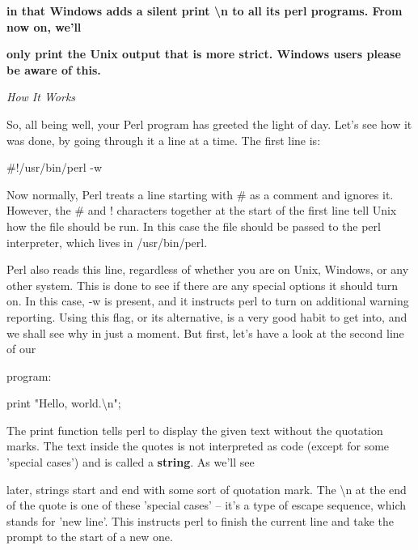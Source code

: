 \documentclass[a4paper,11pt]{book}
\begin{document}
\noindent \textbf{in that Windows adds a silent print \textbackslash n to all its perl programs. From now on, we'll}

\noindent \textbf{only print the Unix output that is more strict. Windows users please be aware of this.}

\noindent 

\noindent 

\noindent \textit{How It Works}

\noindent So, all being well, your Perl program has greeted the light of day. Let's see how it was done, by going through it a line at a time. The first line is:

\noindent 

\noindent 

\noindent \#!/usr/bin/perl -w

\noindent 

\noindent Now normally, Perl treats a line starting with \# as a comment and ignores it. However, the \# and ! characters together at the start of the first line tell Unix how the file should be run. In this case the file should be passed to the perl interpreter, which lives in /usr/bin/perl.

\noindent 

\noindent Perl also reads this line, regardless of whether you are on Unix, Windows, or any other system. This is done to see if there are any special options it should turn on. In this case, -w is present, and it instructs perl to turn on additional warning reporting. Using this flag, or its alternative, is a very good habit to get into, and we shall see why in just a moment. But first, let's have a look at the second line of our

\noindent program:

\noindent 

\noindent 

\noindent print "Hello, world.\textbackslash n";

\noindent 

\noindent The print function tells perl to display the given text without the quotation marks. The text inside the quotes is not interpreted as code (except for some 'special cases') and is called a \textbf{string}. As we'll see

\noindent later, strings start and end with some sort of quotation mark. The \textbackslash n at the end of the quote is one of these  'special cases' -- it's a type of escape sequence, which stands for 'new line'. This instructs perl to finish the current line and take the prompt to the start of a new one.
\end{document}
